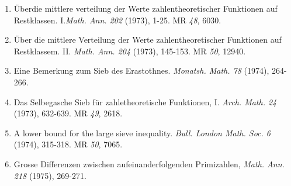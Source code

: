 \begin{thebibliography}{99}
\begin{enumerate}
\item \"{U}ber\pageoriginale die mittlere verteilung der Werte
  zahlentheoretischer 
  Funktionen auf Restklassen. I.{\em  Math. Ann. 202} (1973), 1-25. MR
  {\em 48}, 6030.

\item \"{U}ber die mittlere Verteilung der Werte zahlentheoretischer
  Funktionen auf Restklassem. II. \textit{Math. Ann. 204} (1973),
  145-153. MR {\em 50}, 12940.

\item Eine Bemerkung zum Sieb des
  Erastothnes. \textit{Monatsh. Math. 78} (1974), 264-266.

\item Das Selbegasche Sieb f\"{u}r zahletheoretische Funktionen,
  I. \textit{Arch. Math. 24} (1973), 632-639. MR {\em 49}, 2618. 

\item A lower bound for the large sieve
  inequality. \textit{Bull. London Math. Soc. 6} (1974), 315-318. MR
  {\em 50}, 7065.

\item Grosse Differenzen zwischen aufeinanderfolgenden Primizahlen,
  \textit{Math. Ann. 218} (1975), 269-271. 
\end{enumerate}
\end{thebibliography}
